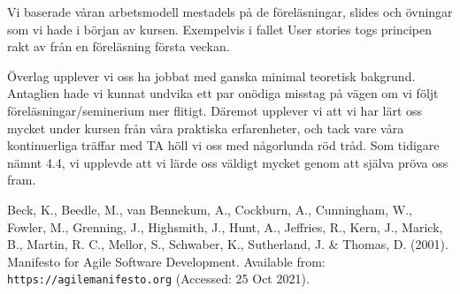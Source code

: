 \documentclass{scrartcl}
\begin{document}
Vi baserade våran arbetsmodell mestadels på de föreläsningar, slides och övningar som vi hade i början av kursen. Exempelvis i fallet User stories togs principen rakt av från en föreläsning första veckan. 

Överlag upplever vi oss ha jobbat med ganska minimal teoretisk bakgrund. Antaglien hade vi kunnat undvika ett par onödiga misstag på vägen om vi följt föreläsningar/seminerium mer flitigt. Däremot upplever vi att vi har lärt oss mycket under kursen från våra praktiska erfarenheter, och tack vare våra kontinuerliga träffar med TA höll vi oss med någorlunda röd tråd. Som tidigare nämnt 4.4, vi upplevde att vi lärde oss väldigt mycket genom att själva pröva oss fram.




\pagebreak
\begin{thebibliography}{99}
 Beck, K., Beedle, M., van Bennekum, A., Cockburn, A., Cunningham, W., Fowler, M., Grenning, J., Highsmith, J., Hunt, A., Jeffries, R., Kern, J., Marick, B., Martin, R. C., Mellor, S., Schwaber, K., Sutherland, J. \& Thomas, D. (2001). Manifesto for Agile Software Development. Available from:\\\texttt{https://agilemanifesto.org} (Accessed: 25 Oct 2021).
\end{thebibliography}
\end{document}
